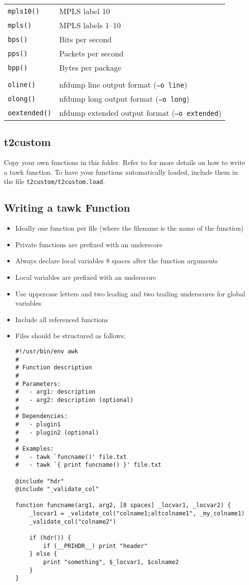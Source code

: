\documentclass[documentation]{subfiles}
\begin{document}
\begin{longtable}{ll}
    {\tt mpls10()}    & MPLS label 10\\
    {\tt mpls()}      & MPLS labels 1--10\\
    {\tt bps()}       & Bits per second\\
    {\tt pps()}       & Packets per second\\
    {\tt bpp()}       & Bytes per package\\\\
    {\tt oline()}     & nfdump line output format ({\tt --o line})\\
    {\tt olong()}     & nfdump long output format ({\tt --o long})\\
    {\tt oextended()} & nfdump extended output format ({\tt --o extended})\\
    \bottomrule
\end{longtable}

\subsection{t2custom}\label{t2custom}
Copy your own functions in this folder.
Refer to  for more details on how to write a tawk function.
To have your functions automatically loaded, include them in the file {\tt t2custom/t2custom.load}.

\subsection{Writing a tawk Function}\label{tawk-write-func}
\begin{itemize}
    \item Ideally one function per file (where the filename is the name of the function)
    \item Private functions are prefixed with an underscore
    \item Always declare local variables 8 spaces after the function arguments
    \item Local variables are prefixed with an underscore
    \item Use uppercase letters and two leading and two trailing underscores for global variables
    \item Include all referenced functions
    \item Files should be structured as follows:
\begin{verbatim}
#!/usr/bin/env awk
#
# Function description
#
# Parameters:
#   - arg1: description
#   - arg2: description (optional)
#
# Dependencies:
#   - plugin1
#   - plugin2 (optional)
#
# Examples:
#   - tawk `funcname()' file.txt
#   - tawk `{ print funcname() }' file.txt

@include "hdr"
@include "_validate_col"

function funcname(arg1, arg2, [8 spaces] _locvar1, _locvar2) {
    _locvar1 = _validate_col("colname1;altcolname1", _my_colname1)
    _validate_col("colname2")

    if (hdr()) {
        if (__PRIHDR__) print "header"
    } else {
        print "something", $_locvar1, $colname2
    }
}
\end{verbatim}
\end{itemize}
\end{document}
